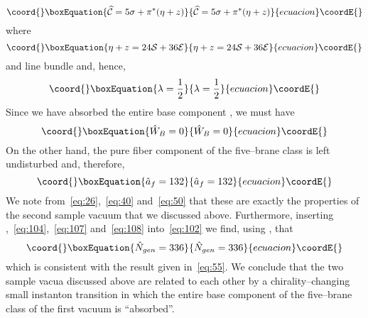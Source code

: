 \documentclass[a4paper,12pt]{article}
\numberwithin{equation}{section}
\def\cC{{\mathcal C}}
\def\cE{{\mathcal E}}
\def\cN{{\mathcal N}}
\def\cS{{\mathcal S}}
\theoremstyle{plain}
\begin{document}
\begin{equation}\coord{}\boxEquation{
\widehat{\cC}=5\sigma+\pi^{*}(\eta+ z)
\label{eq:109}
}{
\widehat{\cC}=5\sigma+\pi^{*}(\eta+ z)
}{ecuacion}\coordE{}\end{equation}
where
\begin{equation}\coord{}\boxEquation{
\eta+ z=24\cS+36\cE
\label{eq:110}
}{
\eta+ z=24\cS+36\cE
}{ecuacion}\coordE{}\end{equation}
and line bundle \myHighlight{$\widehat{\cN}=\cN$}\coordHE{} and, hence,
\begin{equation}\coord{}\boxEquation{
\lambda=\frac{1}{2}
\label{eq:111}
}{
\lambda=\frac{1}{2}
}{ecuacion}\coordE{}\end{equation}
Since we have absorbed the entire base component \coordHE{}, we must have
\begin{equation}\coord{}\boxEquation{
\hat{W}_{B}=0
\label{eq:112}
}{
\hat{W}_{B}=0
}{ecuacion}\coordE{}\end{equation}
On the other hand, the pure fiber component of the five--brane class is left
undisturbed and, therefore,
\begin{equation}\coord{}\boxEquation{
\hat{a}_{f}=132
\label{eq:113}
}{
\hat{a}_{f}=132
}{ecuacion}\coordE{}\end{equation}
We note from~\eqref{eq:26},~\eqref{eq:40} and~\eqref{eq:50} 
that these are exactly the properties of the second sample vacuum that
we discussed above. Furthermore, inserting
\coordHE{},~\eqref{eq:104},~\eqref{eq:107} and~\eqref{eq:108} into~\eqref{eq:102} we
find, using \coordHE{}, that
\begin{equation}\coord{}\boxEquation{
\hat{N}_{gen}=336
\label{eq:114}
}{
\hat{N}_{gen}=336
}{ecuacion}\coordE{}\end{equation}
which is consistent with the result given in~\eqref{eq:55}. We conclude that
the two sample vacua discussed above are related to each other by a
chirality--changing small instanton transition in which the entire base
component of the five--brane class of the first vacuum is ``absorbed''.

\bigskip
\end{document}
